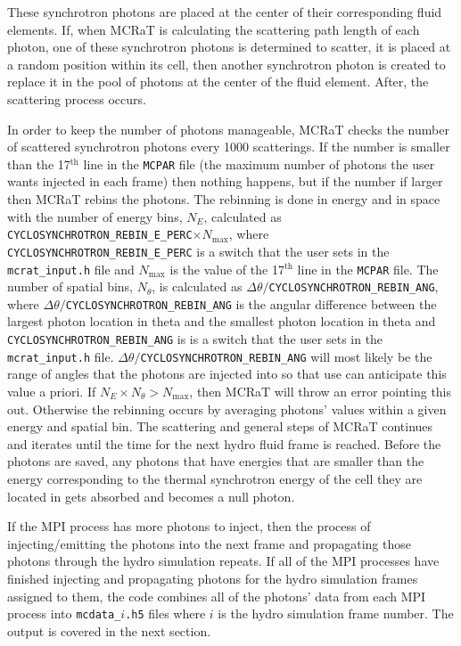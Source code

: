 \documentclass[12pt,a4paper]{article}
\begin{document}
These synchrotron photons are placed at the center of their corresponding fluid elements. If, when MCRaT is calculating the scattering path length of each photon, one of these synchrotron photons is determined to scatter, it is placed at a random position within its cell, then another synchrotron photon is created to replace it in the pool of photons at the center of the fluid element. After, the scattering process occurs.

In order to keep the number of photons manageable, MCRaT checks the number of scattered synchrotron photons every 1000 scatterings. If the number is smaller than the 17$^\textrm{th}$ line in the \texttt{MCPAR} file (the maximum number of photons the user wants injected in each frame) then nothing happens, but if the number if larger then MCRaT rebins the photons. The rebinning is done in energy and in space with the number of energy bins, $N_E$, calculated as \texttt{CYCLOSYNCHROTRON\_REBIN\_E\_PERC}$\times N_\mathrm{max}$, where \texttt{CYCLOSYNCHROTRON\_REBIN\_E\_PERC} is a switch that the user sets in the \texttt{mcrat\_input.h} file and $N_\mathrm{max}$ is the value of the 17$^\textrm{th}$ line in the \texttt{MCPAR} file. The number of spatial bins, $N_\theta$, is calculated as $\Delta \theta/$\texttt{CYCLOSYNCHROTRON\_REBIN\_ANG}, where $\Delta \theta/$\texttt{CYCLOSYNCHROTRON\_REBIN\_ANG} is the angular difference between the largest photon location in theta and the smallest photon location in theta and \texttt{CYCLOSYNCHROTRON\_REBIN\_ANG} is is a switch that the user sets in the \texttt{mcrat\_input.h} file. $\Delta \theta/$\texttt{CYCLOSYNCHROTRON\_REBIN\_ANG} will most likely be the range of angles that the photons are injected into so that use can anticipate this value a priori. If $N_E\times N_\theta>N_\mathrm{max}$, then MCRaT will throw an error pointing this out. Otherwise the rebinning occurs by averaging photons' values within a given energy and spatial bin. The scattering and general steps of MCRaT continues and iterates until the time for the next hydro fluid frame is reached. Before the photons are saved, any photons that have energies that are smaller than the energy corresponding to the thermal synchrotron energy of the cell they are located in gets absorbed and becomes a null photon. 

If the MPI process has more photons to inject, then the process of injecting/emitting the photons into the next frame and propagating those photons through the hydro simulation repeats. If all of the MPI processes have finished injecting and propagating photons for the hydro simulation frames assigned to them, the code combines all of the photons' data from each MPI process into \texttt{mcdata\_$i$.h5} files where $i$ is the hydro simulation frame number. The output is covered in the next section.
\end{document}
